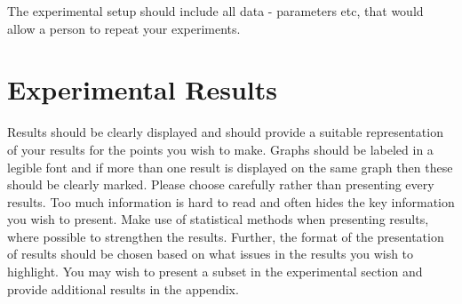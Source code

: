 The experimental setup should include all data - parameters etc, that would allow a person to repeat your experiments. 

\section{Experimental Results}
\label{sec:experimentalResults}

Results should be clearly displayed and should provide a suitable representation of your results for the points you wish to make. Graphs should be labeled in a legible font and if more than one result is displayed on the same graph then these should be clearly marked.   Please choose carefully rather than presenting every results. Too much information is hard to read and often hides the key information you wish to present. Make use of statistical methods when presenting results, where possible to strengthen the results.  Further, the format of the presentation of results should be chosen based on what issues in the results you wish to highlight. You may wish to present a subset in the experimental section and provide additional results in the appendix.

\fi
